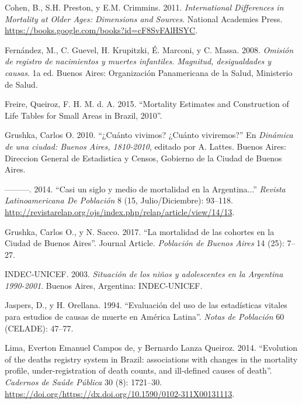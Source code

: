 \documentclass[12pt,spanish,]{article}
\begin{document}
\leavevmode\hypertarget{ref-CohenPrestonCrimmins2011}{}%
Cohen, B., S.H. Preston, y E.M. Crimmins. 2011. \emph{International
Differences in Mortality at Older Ages: Dimensions and Sources}.
National Academies Press.
\url{https://books.google.com/books?id=cF8SvFAlHSYC}.

\leavevmode\hypertarget{ref-FernandezEtAl2008}{}%
Fernández, M., C. Guevel, H. Krupitzki, É. Marconi, y C. Massa. 2008.
\emph{Omisión de registro de nacimientos y muertes infantiles. Magnitud,
desigualdades y causas}. 1a ed. Buenos Aires: Organización Panamericana
de la Salud, Ministerio de Salud.

\leavevmode\hypertarget{ref-FreireEtAl2015}{}%
Freire, Queiroz, F. H. M. d. A. 2015. ``Mortality Estimates and
Construction of Life Tables for Small Areas in Brazil, 2010''.

\leavevmode\hypertarget{ref-Grushka2010}{}%
Grushka, Carlos O. 2010. ``¿Cuánto vivimos? ¿Cuánto viviremos?'' En
\emph{Dinámica de una ciudad: Buenos Aires, 1810-2010}, editado por A.
Lattes. Buenos Aires: Direccion General de Estadistica y Censos,
Gobierno de la Ciudad de Buenos Aires.

\leavevmode\hypertarget{ref-Grushka2014}{}%
---------. 2014. ``Casi un siglo y medio de mortalidad en la
Argentina...'' \emph{Revista Latinoamericana De Población} 8 (15,
Julio/Diciembre): 93--118.
\url{http://revistarelap.org/ojs/index.php/relap/article/view/14/13}.

\leavevmode\hypertarget{ref-GrushkaSacco2017}{}%
Grushka, Carlos O., y N. Sacco. 2017. ``La mortalidad de las cohortes en
la Ciudad de Buenos Aires''. Journal Article. \emph{Población de Buenos
Aires} 14 (25): 7--27.

\leavevmode\hypertarget{ref-INDEC-UNICEF2003}{}%
INDEC-UNICEF. 2003. \emph{Situación de los niños y adolescentes en la
Argentina 1990-2001}. Buenos Aires, Argentina: INDEC-UNICEF.

\leavevmode\hypertarget{ref-JaspersOrellana1994}{}%
Jaspers, D., y H. Orellana. 1994. ``Evaluación del uso de las
estadísticas vitales para estudios de causas de muerte en América
Latina''. \emph{Notas de Población} 60 (CELADE): 47--77.

\leavevmode\hypertarget{ref-LimaQueiroz2014}{}%
Lima, Everton Emanuel Campos de, y Bernardo Lanza Queiroz. 2014.
``Evolution of the deaths registry system in Brazil: associations with
changes in the mortality profile, under-registration of death counts,
and ill-defined causes of death''. \emph{Cadernos de Saúde Pública} 30
(8): 1721--30.
\url{https://doi.org/https://dx.doi.org/10.1590/0102-311X00131113}.
\end{document}
